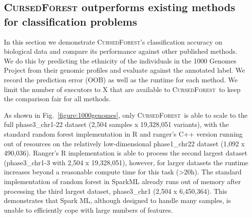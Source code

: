 \documentclass[10pt,letterpaper]{article}
\newcommand{\cursedforest}{\textsc{CursedForest}\xspace}
\begin{document}



\subsection{\cursedforest outperforms existing methods for classification problems}
In this section we demonstrate \cursedforest's classification accuracy on biological data and compare its performance against other published methods. 
We do this by predicting the ethnicity of the individuals in the 1000 Genomes Project from their genomic profiles and evaluate against the annotated label. 
We record the prediction error (OOB) as well as the runtime for each method. 
We limit the number of executors to X that are available to \cursedforest\ to keep the comparison fair for all methods.  

As shown in Fig.~\ref{figure:1000genomes}, only \cursedforest\ is able to scale to the full phase3\_chr1-22 dataset (2,504 samples x 19,328,051 variants), with
the standard random forest implementation in R and ranger's C++ version running out of resources on the relatively low-dimensional
phase1\_chr22 dataset (1,092 x 490,036). Ranger's R implementation is able to process the second largest dataset (phase3\_chr1-3 with 2,504 x 19,328,051), however, for larger datasets the runtime increases beyond a reasonable compute time for this task (>20h). 
The standard implementation of random forest in SparkML already runs out of memory after processing the third largest dataset, phase3\_chr1 (2,504 x 6,450,364). 
This demonstrates that Spark ML, although designed to handle many samples, is unable to efficiently cope with large numbers of features. 
\end{document}
